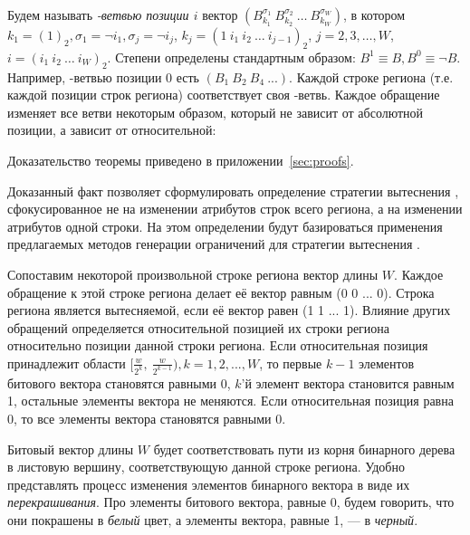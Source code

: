 Будем называть \emph{\PseudoLRU-ветвью позиции $i$} вектор
$(B_{k_1}^{\sigma_1}~B_{k_2}^{\sigma_2}~\dots~B_{k_W}^{\sigma_W})$,
в котором $k_1 = (1)_2, \sigma_1 = \neg i_1, \sigma_j = \neg i_j$, $k_j = (1~i_1~i_2~\dots~i_{j-1})_2$, $j = 2, 3, \dots, W$, $i = (i_1~i_2~\dots~i_W)_2$. Степени определены стандартным образом: $B^1 \equiv B, B^0 \equiv \neg B$. Например, \PseudoLRU-ветвью позиции 0 есть $(B_1~B_2~B_4~...)$. Каждой строке региона (т.е. каждой позиции строк региона) соответствует своя \PseudoLRU-ветвь. Каждое обращение изменяет все ветви некоторым образом, который не зависит от абсолютной позиции, а зависит от относительной:

\begin{theorem}\label{thm_pseudoLRU_invariant} \PseudoLRUInvariant
\end{theorem}
Доказательство теоремы приведено в приложении~\ref{sec:proofs}.

Доказанный факт позволяет сформулировать определение стратегии
вытеснения \PseudoLRU, сфокусированное не на изменении атрибутов строк всего
региона,
а на изменении атрибутов одной строки. На этом определении
будут базироваться применения предлагаемых методов генерации
ограничений для стратегии вытеснения \PseudoLRU.

\begin{utv}
Сопоставим некоторой произвольной строке региона вектор длины $W$. Каждое обращение к этой строке региона делает её вектор равным (0 0 ... 0). Строка региона является вытесняемой, если её вектор равен (1 1 ... 1).
Влияние других обращений определяется относительной позицией их
строки региона относительно позиции данной строки региона. Если относительная позиция
принадлежит области $[\frac{w}{2^k},~\frac{w}{2^{k-1}}), k =
1,2,...,W$, то первые $k{-}1$ элементов битового вектора становятся равными
0, $k$'й элемент вектора становится равным 1, остальные элементы
вектора не меняются. Если относительная позиция равна 0, то все элементы вектора становятся равными 0.
\end{utv}

Битовый вектор длины $W$ будет соответствовать пути из корня бинарного
дерева в листовую вершину, соответствующую данной строке региона.
Удобно представлять процесс изменения элементов бинарного вектора  в виде их
\emph{перекрашивания}. Про элементы битового вектора, равные 0,
будем говорить, что они покрашены в \emph{белый} цвет, а элементы вектора, равные 1, --- в \emph{черный}.

